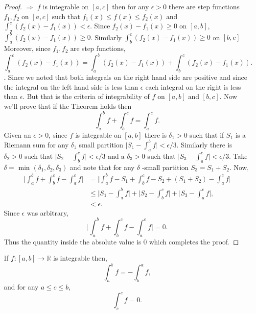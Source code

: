 \begin{proof}
    $\Rightarrow$
    $f$ is integrable on $\left[a,c\right]$ then for any $\epsilon > 0$ there are step functions
    $f_1,f_2$ on $\left[a,c\right]$ such that $f_1(x) \leq f(x) \leq f_2(x)$ and $\int_a^c (f_2(x) -
    f_1(x)) < \epsilon$. Since $f_2(x) - f_1(x) \geq 0$ on $\left[a,b\right]$, $\int_a^b(f_2(x) -
    f_1(x)) \geq 0$. Similarly $\int_b^c (f_2(x) - f_1(x)) \geq 0 $ on $\left[b,c\right]$ Moreover,
    since $f_1,f_2$ are step functions,
    \[\int_a^c (f_2(x) - f_1(x)) = \int_a^b (f_2(x) - f_1(x)) + \int_b^c (f_2(x) - f_1(x)).\]. Since
    we noted that both integrals on the right hand side are positive and since the integral on the
    left hand side is less than $\epsilon$ each integral on the right is less than $\epsilon$. But
    that is the criteria of integrability of $f$ on $\left[a,b\right]$ and $\left[b,c\right]$.
    Now we'll prove that if the Theorem holds then \[  \int_a^b f + \int_b^c f = \int_a^c f . \]
    Given an $\epsilon > 0$, since $f$ is integrable on $\left[a,b\right]$ there is $\delta_{1} > 0$
    such that if $S_1$ is a Riemann sum for any $\delta_{1}$ small partition 
    $\lvert S_1 - \int_a^b f \rvert < \epsilon /3 $. Similarly there is $\delta_{2} > 0 $ such that
    $\lvert S_2 - \int_b^c f \rvert < \epsilon /3$ and a $\delta_{3} > 0$ such that 
    $\lvert S_3 - \int_a^c f \rvert < \epsilon /3$. Take $\delta = \text{ min
    }(\delta_1,\delta_2,\delta_3)$ and note that for any $\delta$ -small partition  $S_3 = S_1 +
    S_2$. Now,
    \begin{displaymath}
	\begin{aligned}
	    \lvert \int_a^b f +  \int_b^c f -  \int_a^c f \rvert & = \lvert \int_a^b f - S_1 + 
	    \int_b^c f - S_2  +  (S_1 + S_2) - \int_a^c f \rvert  \\
	    & \leq \lvert S_1 - \int_a^b f \rvert + \lvert S_2 - \int_b^c f \rvert + 
	    \lvert S_3 - \int_a^c f \rvert , \\
	    & < \epsilon . 
	\end{aligned}
    \end{displaymath}
    Since $\epsilon$ was arbitrary,
    \[ \lvert \int_a^b f +  \int_b^c f -  \int_a^c f \rvert = 0. \] Thus the quantity inside the
    absolute value is $0$ which completes the proof.
\end{proof}
\begin{Definition} 
    If $f : \left[a,b\right] \to \mathbb{R}$ is integrable then,
    \[ \int_a^b f = - \int_b^a f, \] and for any $a \leq c \leq b$,
    \[ \int_c^c f = 0.\]
\end{Definition}
